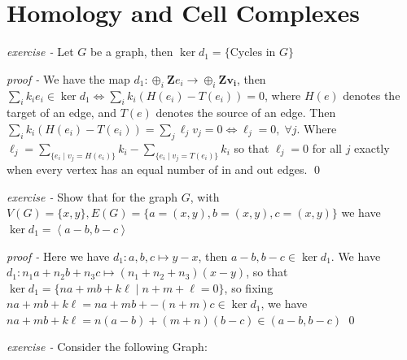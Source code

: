 \documentclass[11pt]{article}
\theoremstyle{definition}
\newcommand{\set}[1]{\{#1\}}
\newcommand{\gen}[1]{\left\langle #1 \right\rangle}
\begin{document}
\section{Homology and Cell Complexes}

\emph{exercise - }\label{HEx1} Let \(G\) be a graph, then \(\ker d_1 = \set{\text{Cycles in }G}\)

\emph{proof - } We have the map \(d_1: \oplus_i \mathbf{Z}e_i \to \oplus_i \mathbf{Zv_i}\), then \(\sum_i k_i e_i \in \ker d_1 \iff \sum_i k_i (H(e_i) - T(e_i)) = 0\), where \(H(e)\) denotes the target of an edge, and \(T(e)\) denotes the source of an edge. Then \(\sum_i k_i (H(e_i) - T(e_i)) = \sum_j\ell_j v_j = 0 \iff \ell_j = 0,\; \forall j\). Where \(\ell_j = \sum_{\set{e_i \mid v_j = H(e_i)}} k_i - \sum_{\set{e_i \mid v_j = T(e_i)}} k_i\) so that \(\ell_j = 0\) for all \(j\) exactly when every vertex has an equal number of in and out edges. \qed


\emph{exercise - }\label{HEx2} Show that for the graph \(G\), with \(V(G) = \set{x,y}, E(G) = \set{a = (x,y),b = (x,y), c = (x,y)}\) we have \(\ker d_1 = \gen{a-b, b-c}\)

\emph{proof - } Here we have \(d_1: a,b,c \mapsto y-x\), then \(a-b, b-c \in \ker d_1\). We have \(d_1: n_1a + n_2b + n_3c \mapsto (n_1 + n_2 + n_3)(x-y)\), so that \(\ker d_1 = \set{na + mb + k\ell \mid n + m + \ell = 0}\), so fixing \(na + mb + k\ell = na + mb + -(n+m)c \in \ker d_1\), we have \(na + mb + k\ell = n(a-b) + (m+n)(b-c) \in (a-b,b-c)\) \qed


\emph{exercise - }\label{HEx3} Consider the following Graph:
\end{document}
